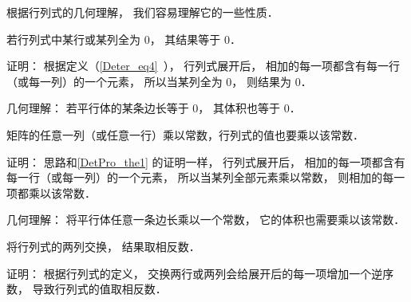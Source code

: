 

根据行列式的几何理解， 我们容易理解它的一些性质．

\begin{theorem}{ } \label{DetPro_the1}
若行列式中某行或某列全为 0， 其结果等于 0．
\end{theorem}
证明： 根据定义（\autoref{Deter_eq4}~）， 行列式展开后， 相加的每一项都含有每一行（或每一列）的一个元素， 所以当某列全为 0， 则结果为 0．

几何理解： 若平行体的某条边长等于 0， 其体积也等于 0．

\begin{theorem}{ } \label{DetPro_the3}
矩阵的任意一列（或任意一行）乘以常数，行列式的值也要乘以该常数．
\end{theorem}
证明： 思路和\autoref{DetPro_the1} 的证明一样， 行列式展开后， 相加的每一项都含有每一行（或每一列）的一个元素， 所以当某列全部元素乘以常数， 则相加的每一项都乘以该常数．

几何理解： 将平行体任意一条边长乘以一个常数， 它的体积也需要乘以该常数．

\begin{theorem}{ }
将行列式的两列交换， 结果取相反数．
\end{theorem}
证明： 根据行列式的定义， 交换两行或两列会给展开后的每一项增加一个逆序数， 导致行列式的值取相反数．

